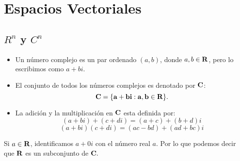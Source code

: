 \chapter{Espacios Vectoriales}

\section{\boldmath $R^n$ y $C^n$}

\begin{tcolorbox}
    \begin{def.} \hfill
	\begin{itemize}
	    \item Un número complejo es un par ordenado $(a,b)$, donde $a,b\in \bf{R}$, pero lo escribimos como $a+bi$.
	    \item El conjunto de todos los números complejos es denotado por $\bf{C}$:
		$$\bf{C}=\lbrace a+bi:a,b\in \bf{R}\rbrace.$$

	    \item La adición y la multiplicación en $\bf{C}$ esta definida por:
		$$(a+bi)+(c+di)=(a+c)+(b+d)i$$
		$$(a+bi)(c+di)=(ac-bd)+(ad+bc)i$$
	\end{itemize}
    \end{def.}
\end{tcolorbox}

Si $a\in \bf{R}$, identificamos $a+0i$ con el número real $a$. Por lo que podemos decir que $\bf{R}$ es un subconjunto de $\bf{C}.$

